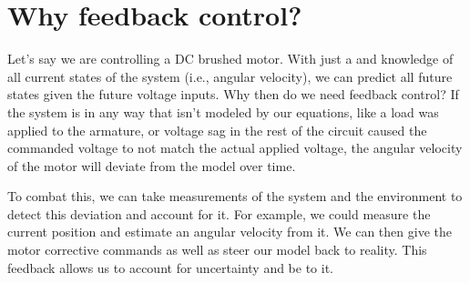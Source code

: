 \section{Why feedback control?}

Let's say we are controlling a DC brushed motor. With just a
 and knowledge of all current \glspl{state}
of the \gls{system} (i.e., angular velocity), we can predict all future
\glspl{state} given the future voltage \glspl{input}. Why then do we need
feedback control? If the \gls{system} is  in any
way that isn't modeled by our equations, like a load was applied to the
armature, or voltage sag in the rest of the circuit caused the commanded voltage
to not match the actual applied voltage, the angular velocity of the motor will
deviate from the \gls{model} over time.

To combat this, we can take measurements of the \gls{system} and the environment
to detect this deviation and account for it. For example, we could measure the
current position and estimate an angular velocity from it. We can then give the
motor corrective commands as well as steer our \gls{model} back to reality. This
feedback allows us to account for uncertainty and be
 to it.

